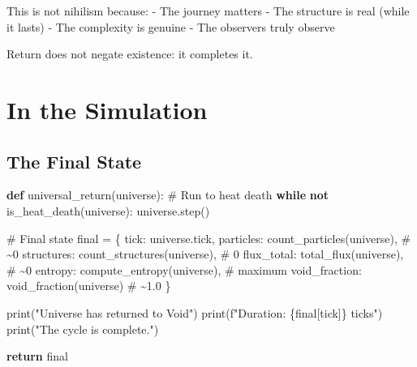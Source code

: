 \documentclass[
  11pt,
  letterpaper,
  twoside,
  openright]{book}
\newenvironment{Shaded}{\begin{snugshade}}{\end{snugshade}}
\newcommand{\BuiltInTok}[1]{\textcolor[rgb]{0.00,0.23,0.31}{#1}}
\newcommand{\CommentTok}[1]{\textcolor[rgb]{0.37,0.37,0.37}{#1}}
\newcommand{\ControlFlowTok}[1]{\textcolor[rgb]{0.00,0.23,0.31}{\textbf{#1}}}
\newcommand{\KeywordTok}[1]{\textcolor[rgb]{0.00,0.23,0.31}{\textbf{#1}}}
\newcommand{\NormalTok}[1]{\textcolor[rgb]{0.00,0.23,0.31}{#1}}
\newcommand{\OperatorTok}[1]{\textcolor[rgb]{0.37,0.37,0.37}{#1}}
\newcommand{\SpecialCharTok}[1]{\textcolor[rgb]{0.37,0.37,0.37}{#1}}
\newcommand{\SpecialStringTok}[1]{\textcolor[rgb]{0.13,0.47,0.30}{#1}}
\newcommand{\StringTok}[1]{\textcolor[rgb]{0.13,0.47,0.30}{#1}}
\begin{document}
This is not nihilism because: - The journey matters - The structure is
real (while it lasts) - The complexity is genuine - The observers truly
observe

Return does not negate existence: it completes it.

\section{In the Simulation}\label{in-the-simulation-4}

\subsection{The Final State}\label{the-final-state-1}

\begin{Shaded}
\begin{Highlighting}[]
\KeywordTok{def}\NormalTok{ universal\_return(universe):}
    \CommentTok{\# Run to heat death}
    \ControlFlowTok{while} \KeywordTok{not}\NormalTok{ is\_heat\_death(universe):}
\NormalTok{        universe.step()}

    \CommentTok{\# Final state}
\NormalTok{    final }\OperatorTok{=}\NormalTok{ \{}
        \StringTok{\textquotesingle{}tick\textquotesingle{}}\NormalTok{: universe.tick,}
        \StringTok{\textquotesingle{}particles\textquotesingle{}}\NormalTok{: count\_particles(universe),  }\CommentTok{\# \textasciitilde{}0}
        \StringTok{\textquotesingle{}structures\textquotesingle{}}\NormalTok{: count\_structures(universe),  }\CommentTok{\# 0}
        \StringTok{\textquotesingle{}flux\_total\textquotesingle{}}\NormalTok{: total\_flux(universe),  }\CommentTok{\# \textasciitilde{}0}
        \StringTok{\textquotesingle{}entropy\textquotesingle{}}\NormalTok{: compute\_entropy(universe),  }\CommentTok{\# maximum}
        \StringTok{\textquotesingle{}void\_fraction\textquotesingle{}}\NormalTok{: void\_fraction(universe)  }\CommentTok{\# \textasciitilde{}1.0}
\NormalTok{    \}}

    \BuiltInTok{print}\NormalTok{(}\StringTok{"Universe has returned to Void"}\NormalTok{)}
    \BuiltInTok{print}\NormalTok{(}\SpecialStringTok{f"Duration: }\SpecialCharTok{\{}\NormalTok{final[}\StringTok{\textquotesingle{}tick\textquotesingle{}}\NormalTok{]}\SpecialCharTok{\}}\SpecialStringTok{ ticks"}\NormalTok{)}
    \BuiltInTok{print}\NormalTok{(}\StringTok{"The cycle is complete."}\NormalTok{)}

    \ControlFlowTok{return}\NormalTok{ final}


\end{Highlighting}
\end{Shaded}
\end{document}
